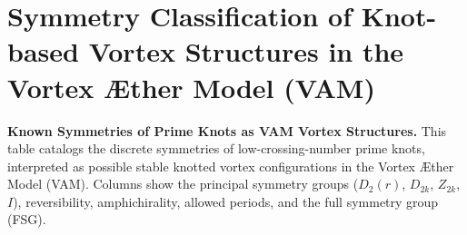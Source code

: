 \documentclass{article}
\begin{document}
\section{Symmetry Classification of Knot-based Vortex Structures in the Vortex Æther Model (VAM)}

\begin{table}[H]
\caption{
\textbf{Known Symmetries of Prime Knots as VAM Vortex Structures.}
This table catalogs the discrete symmetries of low-crossing-number prime knots, interpreted as possible stable knotted vortex configurations in the Vortex Æther Model (VAM). Columns show the principal symmetry groups ($D_2(r)$, $D_{2k}$, $Z_{2k}$, $I$), reversibility, amphichirality, allowed periods, and the full symmetry group (FSG).
}
\centering

\renewcommand{\arraystretch}{1.15}
\setlength{\tabcolsep}{0.45em}


\end{table}
\end{document}
